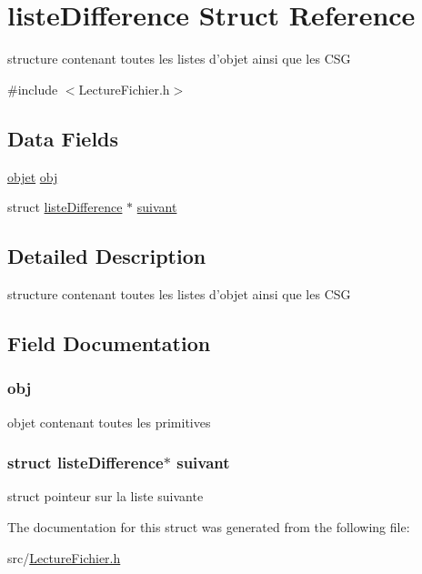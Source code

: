 \hypertarget{structliste_difference}{
\section{listeDifference Struct Reference}
\label{structliste_difference}
}


structure contenant toutes les listes d'objet ainsi que les CSG  




{\ttfamily \#include $<$LectureFichier.h$>$}

\subsection*{Data Fields}
\begin{DoxyCompactItemize}
\item 
\hyperlink{structobjet}{objet} \hyperlink{structliste_difference_a09dc5c908d8f9c6875464379f83976c8}{obj}
\item 
struct \hyperlink{structliste_difference}{listeDifference} $\ast$ \hyperlink{structliste_difference_ac1d1ceaeef64830b0ed8f03fb9273f3e}{suivant}
\end{DoxyCompactItemize}


\subsection{Detailed Description}
structure contenant toutes les listes d'objet ainsi que les CSG 

\subsection{Field Documentation}
\hypertarget{structliste_difference_a09dc5c908d8f9c6875464379f83976c8}{
\subsubsection[{obj}]{ {\bf obj}}}
\label{structliste_difference_a09dc5c908d8f9c6875464379f83976c8}
objet contenant toutes les primitives \hypertarget{structliste_difference_ac1d1ceaeef64830b0ed8f03fb9273f3e}{
\subsubsection[{suivant}]{\setlength{\rightskip}{0pt plus 5cm}struct {\bf listeDifference}$\ast$ {\bf suivant}}}
\label{structliste_difference_ac1d1ceaeef64830b0ed8f03fb9273f3e}
struct pointeur sur la liste suivante 

The documentation for this struct was generated from the following file:\begin{DoxyCompactItemize}
\item 
src/\hyperlink{_lecture_fichier_8h}{LectureFichier.h}\end{DoxyCompactItemize}
